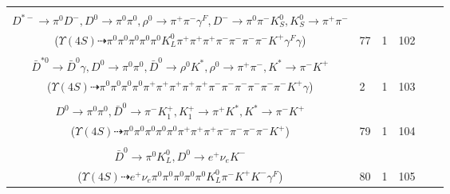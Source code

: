 \documentclass[landscape]{article}
\newcounter{rownumbers}
\newcommand\rn{\stepcounter{rownumbers}\arabic{rownumbers}}
\newcommand{\EOLP}{\\ \hline} %
\newcommand{\topoTags}[1]{#1} %
\begin{document}
\begin{longtable}{clcccc}
\rn & \makecell[l]{ $ 
\Upsilon(4S) \rightarrow B^{0} \bar{B}^{0} ,
B^{0} \rightarrow \rho^{0} \bar{K}^{0} K^{+} \eta^{\prime} D^{*-} ,
\bar{B}^{0} \rightarrow \pi^{0} D^{0} ,
\rho^{0} \rightarrow \pi^{+} \pi^{-} ,
\bar{K}^{0} \rightarrow K_{L}^{0} ,
\eta^{\prime} \rightarrow \rho^{0} \gamma ,
$ \\ $
D^{*-} \rightarrow \pi^{0} D^{-} ,
D^{0} \rightarrow \pi^{0} \pi^{0} ,
\rho^{0} \rightarrow \pi^{+} \pi^{-} \gamma^{F} ,
D^{-} \rightarrow \pi^{0} \pi^{-} K_{S}^{0} ,
K_{S}^{0} \rightarrow \pi^{+} \pi^{-} 
$ \\ ($
\Upsilon(4S) \dashrightarrow \pi^{0} \pi^{0} \pi^{0} \pi^{0} \pi^{0} K_{L}^{0} \pi^{+} \pi^{+} \pi^{+} \pi^{-} \pi^{-} \pi^{-} \pi^{-} K^{+} \gamma^{F} \gamma 
$) } & \topoTags{77 & }1 & 102 \EOLP

\rn & \makecell[l]{ $ 
\Upsilon(4S) \rightarrow B^{0} \bar{B}^{0} ,
B^{0} \rightarrow \rho^{0} \rho^{0} \pi^{+} \pi^{-} \omega \bar{D}^{*0} ,
\bar{B}^{0} \rightarrow \pi^{0} D^{0} ,
\rho^{0} \rightarrow \pi^{+} \pi^{-} ,
\rho^{0} \rightarrow \pi^{+} \pi^{-} ,
\omega \rightarrow \pi^{0} \pi^{+} \pi^{-} ,
$ \\ $
\bar{D}^{*0} \rightarrow \bar{D}^{0} \gamma ,
D^{0} \rightarrow \pi^{0} \pi^{0} ,
\bar{D}^{0} \rightarrow \rho^{0} K^{*} ,
\rho^{0} \rightarrow \pi^{+} \pi^{-} ,
K^{*} \rightarrow \pi^{-} K^{+} 
$ \\ ($
\Upsilon(4S) \dashrightarrow \pi^{0} \pi^{0} \pi^{0} \pi^{0} \pi^{+} \pi^{+} \pi^{+} \pi^{+} \pi^{+} \pi^{-} \pi^{-} \pi^{-} \pi^{-} \pi^{-} \pi^{-} K^{+} \gamma 
$) } & \topoTags{2 & }1 & 103 \EOLP

\rn & \makecell[l]{ $ 
\Upsilon(4S) \rightarrow B^{0} \bar{B}^{0} ,
B^{0} \rightarrow \pi^{+} \rho^{+} \rho^{-} D^{*-} ,
\bar{B}^{0} \rightarrow \pi^{0} D^{0} ,
\rho^{+} \rightarrow \pi^{0} \pi^{+} ,
\rho^{-} \rightarrow \pi^{0} \pi^{-} ,
D^{*-} \rightarrow \pi^{-} \bar{D}^{0} ,
$ \\ $
D^{0} \rightarrow \pi^{0} \pi^{0} ,
\bar{D}^{0} \rightarrow \pi^{-} K_1^{+} ,
K_1^{+} \rightarrow \pi^{+} K^{*} ,
K^{*} \rightarrow \pi^{-} K^{+} 
$ \\ ($
\Upsilon(4S) \dashrightarrow \pi^{0} \pi^{0} \pi^{0} \pi^{0} \pi^{0} \pi^{+} \pi^{+} \pi^{+} \pi^{-} \pi^{-} \pi^{-} \pi^{-} K^{+} 
$) } & \topoTags{79 & }1 & 104 \EOLP

\rn & \makecell[l]{ $ 
\Upsilon(4S) \rightarrow B^{0} \bar{B}^{0} ,
B^{0} \rightarrow K^{+} D^{*-} D^{*0} \gamma^{F} ,
\bar{B}^{0} \rightarrow \pi^{0} D^{0} ,
D^{*-} \rightarrow \pi^{-} \bar{D}^{0} ,
D^{*0} \rightarrow \pi^{0} D^{0} ,
D^{0} \rightarrow \pi^{0} \pi^{0} ,
$ \\ $
\bar{D}^{0} \rightarrow \pi^{0} K_{L}^{0} ,
D^{0} \rightarrow e^{+} \nu_{e} K^{-} 
$ \\ ($
\Upsilon(4S) \dashrightarrow e^{+} \nu_{e} \pi^{0} \pi^{0} \pi^{0} \pi^{0} \pi^{0} K_{L}^{0} \pi^{-} K^{+} K^{-} \gamma^{F} 
$) } & \topoTags{80 & }1 & 105 \EOLP


\end{longtable}
\end{document}

